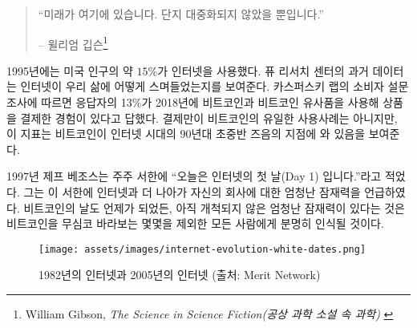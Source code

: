\begin{quotation}\begin{samepage}
		\enquote{미래가 여기에 있습니다. 단지 대중화되지 않았을 뿐입니다.}
		\begin{flushright} -- 윌리엄 깁슨\footnote{William Gibson, \textit{The Science in Science Fiction(공상 과학 소설 속 과학)} \cite{william-gibson}}
\end{flushright}\end{samepage}\end{quotation}

\begin{comment}
	In 1995, about $15\%$ of American adults used the internet. Historical
	data from the Pew Research Center~\cite{pew-research} shows how the internet has woven
	itself into all our lives. According to a consumer survey by Kaspersky
	Lab~\cite{web:kaspersky}, 13\% of respondents have used Bitcoin and its clones to pay for
	goods in 2018. While payments aren't the only use-case of bitcoin, it is
	some indication of where we are in Internet time: in the early- to
	mid-90s.
\end{comment}
1995년에는 미국 인구의 약 $15\%$가 인터넷을 사용했다.
퓨 리서치 센터\cite{pew-research}의 과거 데이터는 인터넷이 우리 삶에 어떻게 스며들었는지를 보여준다.
카스퍼스키 랩\cite{web:kaspersky}의 소비자 설문 조사에 따르면 
응답자의 13\%가 2018년에 비트코인과 비트코인 유사품을 사용해 상품을 결제한 경험이 있다고 답했다.
결제만이 비트코인의 유일한 사용사례는 아니지만, 
이 지표는 비트코인이 인터넷 시대의 90년대 초중반 즈음의 지점에 와 있음을 보여준다.

\begin{comment}
	In 1997, Jeff Bezos stated in a letter to shareholders~\cite{bezos-letter} that
	\enquote{this is Day 1 for the Internet,} recognizing the great untapped
	potential for the internet and, by extension, his company. Whatever day this is
	for Bitcoin, the vast amounts of untapped potential are clear to all but the
	most casual observer.
\end{comment}
1997년 제프 베조스는 주주 서한\cite{bezos-letter}에 \enquote{오늘은 인터넷의 첫 날(Day 1) 입니다.}라고 적었다.
그는 이 서한에 인터넷과 더 나아가 자신의 회사에 대한 엄청난 잠재력을 언급하였다.
비트코인의 날도 언제가 되었든, 아직 개척되지 않은 엄청난 잠재력이 있다는 것은
비트코인을 무심코 바라보는 몇몇을 제외한 모든 사람에게 분명히 인식될 것이다.


\begin{figure}
	\texttt{[image: assets/images/internet-evolution-white-dates.png]}
	\caption{1982년의 인터넷과 2005년의 인터넷 (출처: Merit Network)}
	\label{fig:internet-evolution-white-dates}
\end{figure}

